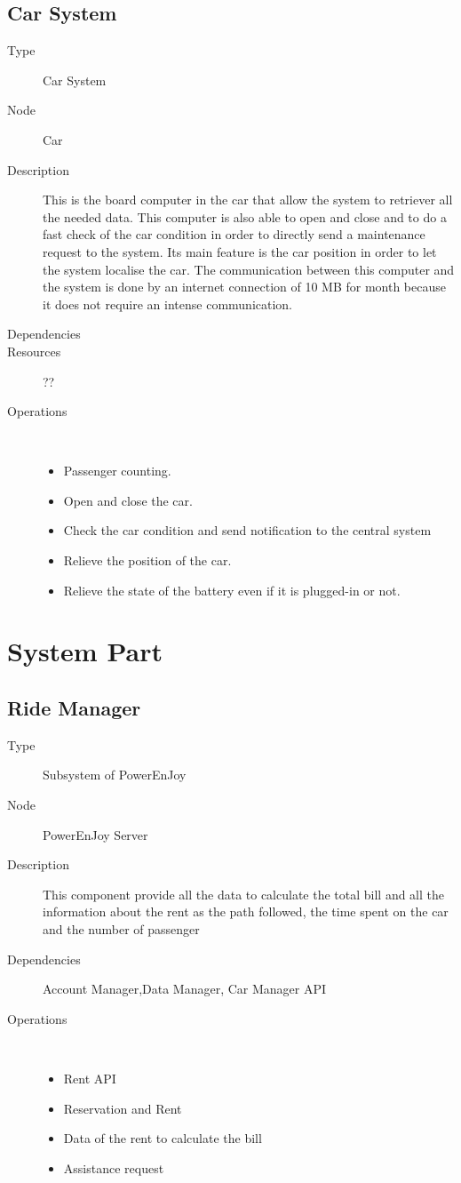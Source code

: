 \subsection{Car System}
\begin{description}
	\item[Type] Car System
	\item[Node] Car
	\item[Description] This is the board computer in the car that allow the system to retriever all the needed data. This computer is also able to open and close and to do a fast check of the car condition in order to directly send a maintenance request to the system. Its main feature is the car position in order to let the system localise the car. The communication between this computer and the system is done by an internet connection of 10 MB for month because it does not require an intense communication.
	\item[Dependencies] 
	\item[Resources] ??
	\item[Operations] \ \\
		\begin{itemize}
			\item Passenger counting.
			\item Open and close the car.
			\item Check the car condition and send notification to the central system
			\item Relieve the position of the car.
			\item Relieve the state of the battery even if it is plugged-in or not. 
		\end{itemize}
\end{description}


\section{System Part}
\subsection{Ride Manager}
\begin{description}
	\item[Type] Subsystem of PowerEnJoy
	\item[Node] PowerEnJoy Server
	\item[Description] This component provide all the data to calculate the total bill and all the information about the rent as the path followed, the time spent on the car and the number of passenger
	\item[Dependencies] Account Manager,Data Manager, Car Manager API
	\item[Operations] \ \\
		\begin{itemize}
			\item Rent API
			\item Reservation and Rent 
			\item Data of the rent to calculate the bill
			\item Assistance request
	\end{itemize}
\end{description}

